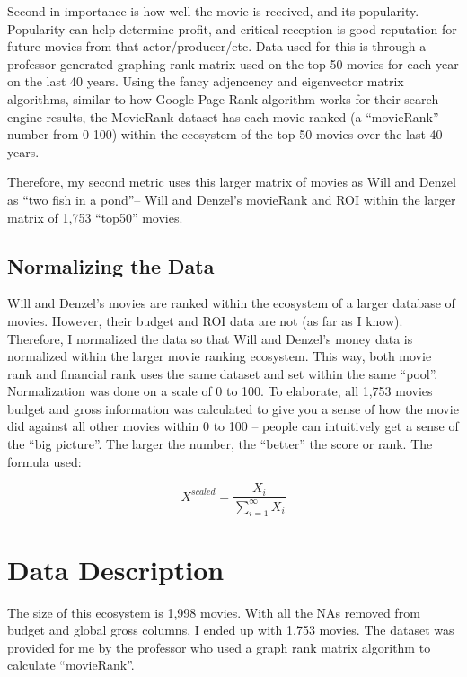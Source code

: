 \documentclass[]{article}
\begin{document}
Second in importance is how well the movie is received, and its
popularity. Popularity can help determine profit, and critical reception
is good reputation for future movies from that actor/producer/etc. Data
used for this is through a professor generated graphing rank matrix used
on the top 50 movies for each year on the last 40 years. Using the fancy
adjencency and eigenvector matrix algorithms, similar to how Google Page
Rank algorithm works for their search engine results, the MovieRank
dataset has each movie ranked (a \enquote{movieRank} number from 0-100)
within the ecosystem of the top 50 movies over the last 40 years.

Therefore, my second metric uses this larger matrix of movies as Will
and Denzel as \enquote{two fish in a pond}-- Will and Denzel's movieRank
and ROI within the larger matrix of 1,753 \enquote{top50} movies.

\subsection{Normalizing the Data}
\label{sec:rq2}

Will and Denzel's movies are ranked within the ecosystem of a larger
database of movies. However, their budget and ROI data are not (as far
as I know). Therefore, I normalized the data so that Will and Denzel's
money data is normalized within the larger movie ranking ecosystem. This
way, both movie rank and financial rank uses the same dataset and set
within the same \enquote{pool}.\\
Normalization was done on a scale of 0 to 100. To elaborate, all 1,753
movies budget and gross information was calculated to give you a sense
of how the movie did against all other movies within 0 to 100 -- people
can intuitively get a sense of the \enquote{big picture}. The larger the
number, the \enquote{better} the score or rank. The formula used:

\begin{equation}
\label{eq:my-formula}
    X^{scaled} = \frac{X_i}{\sum_{i=1}^{\infty} X_{i}}  
\end{equation}

\section{Data Description}
\label{sec:data}

The size of this ecosystem is 1,998 movies. With all the NAs removed
from budget and global gross columns, I ended up with 1,753 movies. The
dataset was provided for me by the professor who used a graph rank
matrix algorithm to calculate \enquote{movieRank}.
\end{document}

